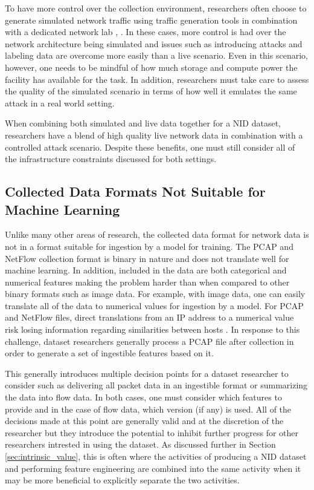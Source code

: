 \documentclass[conference]{IEEEtran}
\begin{document}
To have more control over the collection environment, researchers often choose to generate simulated network traffic using traffic generation tools in combination with a dedicated network lab \cite{unswnb15}, \cite{sharafaldin2018toward}.
In these cases, more control is had over the network architecture being simulated and issues such as introducing attacks and labeling data are overcome more easily than a live scenario.
Even in this scenario, however, one needs to be mindful of how much storage and compute power the facility has available for the task.
In addition, researchers must take care to assess the quality of the simulated scenario in terms of how well it emulates the same attack in a real world setting.

When combining both simulated and live data together for a NID dataset, researchers have a blend of high quality live network data in combination with a controlled attack scenario.
Despite these benefits, one must still  consider all of the infrastructure constraints discussed for both settings.

\subsection{Collected Data Formats Not Suitable for Machine Learning}\label{subsec:collectionformat}
Unlike many other areas of research, the collected data format for network data is not in a format suitable for ingestion by a model for training.
The PCAP and NetFlow collection format is binary in nature and does not translate well for machine learning.
In addition, included in the data are both categorical and numerical features making the problem harder than when compared to other binary formats such as image data. 
For example, with image data, one can easily translate all of the data to numerical values for ingestion by a model.
For PCAP and NetFlow files, direct translations from an IP address to a numerical value risk losing information regarding similarities between hosts \cite{ringip2vec}.
In response to this challenge, dataset researchers generally process a PCAP file after collection in order to generate a set of ingestible features based on it.

This generally introduces multiple decision points for a dataset researcher to consider such as delivering all packet data in an ingestible format or summarizing the data into flow data. 
In both cases, one must consider which features to provide and in the case of flow data, which version (if any) is used.
All of the decisions made at this point are generally valid and at the discretion of the researcher but they introduce the potential to inhibit further progress for other researchers intrested in using the dataset.
As discussed further in Section \ref{sec:intrinsic_value}, this is often where the activities of producing a NID dataset and performing feature engineering are combined into the same activity when it may be more beneficial to explicitly separate the two activities.
\end{document}
